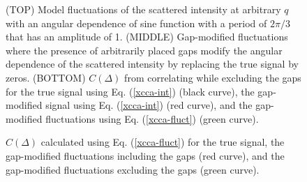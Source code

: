 \documentclass[12pt]{article}
\begin{document}
\begin{figure}
  \centering
  \caption{ \small (TOP) Model fluctuations of the scattered intensity at arbitrary $q$ with an angular dependence of sine function with a period of $2\pi/3$ that has an amplitude of 1. (MIDDLE) Gap-modified fluctuations where the presence of arbitrarily placed gaps modify the angular dependence of the scattered intensity by replacing the true signal by zeros. (BOTTOM) $C(\Delta)$ from correlating while excluding the gaps for the true signal using Eq. (\ref{xcca-int}) (black curve), the gap-modified signal using Eq. (\ref{xcca-int}) (red curve), and the gap-modified fluctuations using Eq. (\ref{xcca-fluct}) (green curve).}
  \label{fig-exclude-gaps}
\end{figure}

\begin{figure}
  \centering
  \caption{ \small $C(\Delta)$ calculated using Eq. (\ref{xcca-fluct}) for the true signal, the gap-modified fluctuations including the gaps (red curve), and the gap-modified fluctuations excluding the gaps (green curve).}
  \label{fig-xcca-fluct}
\end{figure}
\end{document}

